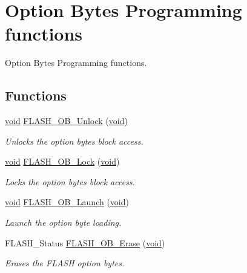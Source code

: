 \hypertarget{group___f_l_a_s_h___group3}{\section{Option Bytes Programming functions}
\label{group___f_l_a_s_h___group3}
}


Option Bytes Programming functions.  


\subsection*{Functions}
\begin{DoxyCompactItemize}
\item 
\hyperlink{group___n_a_m_e_ga18028b8badbf1ea7e704ccac3c488e82}{void} \hyperlink{group___f_l_a_s_h___group3_ga518d6e3bbba2adf1523e8454f62348e9}{F\-L\-A\-S\-H\-\_\-\-O\-B\-\_\-\-Unlock} (\hyperlink{group___n_a_m_e_ga18028b8badbf1ea7e704ccac3c488e82}{void})
\begin{DoxyCompactList}\small\item\em Unlocks the option bytes block access. \end{DoxyCompactList}\item 
\hyperlink{group___n_a_m_e_ga18028b8badbf1ea7e704ccac3c488e82}{void} \hyperlink{group___f_l_a_s_h___group3_ga63a33d9af7e29b64c3806e5505c59b74}{F\-L\-A\-S\-H\-\_\-\-O\-B\-\_\-\-Lock} (\hyperlink{group___n_a_m_e_ga18028b8badbf1ea7e704ccac3c488e82}{void})
\begin{DoxyCompactList}\small\item\em Locks the option bytes block access. \end{DoxyCompactList}\item 
\hyperlink{group___n_a_m_e_ga18028b8badbf1ea7e704ccac3c488e82}{void} \hyperlink{group___f_l_a_s_h___group3_ga3265c1fe74a2703cc5a70a4afa41c09c}{F\-L\-A\-S\-H\-\_\-\-O\-B\-\_\-\-Launch} (\hyperlink{group___n_a_m_e_ga18028b8badbf1ea7e704ccac3c488e82}{void})
\begin{DoxyCompactList}\small\item\em Launch the option byte loading. \end{DoxyCompactList}\item 
F\-L\-A\-S\-H\-\_\-\-Status \hyperlink{group___f_l_a_s_h___group3_ga132f1e95f6b41e01d6e35d4f1f2050b4}{F\-L\-A\-S\-H\-\_\-\-O\-B\-\_\-\-Erase} (\hyperlink{group___n_a_m_e_ga18028b8badbf1ea7e704ccac3c488e82}{void})
\begin{DoxyCompactList}\small\item\em Erases the F\-L\-A\-S\-H option bytes. \end{DoxyCompactList}\item 

\end{DoxyCompactItemize}
